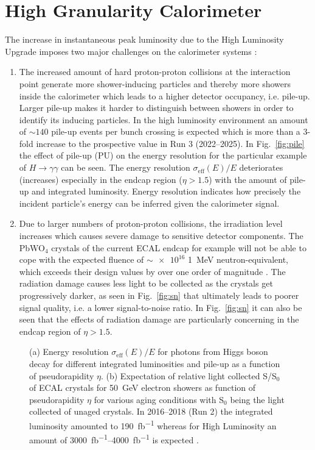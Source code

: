 \documentclass[../../main.tex]{subfiles}
\begin{document}
\section{High Granularity Calorimeter}\label{chp:hgcal}
The increase in instantaneous peak luminosity due to the High Luminosity Upgrade imposes two major challenges on the calorimeter systems \cite{db_hgcal}:
\begin{enumerate}
	\item The increased amount of hard proton-proton collisions at the interaction point generate more shower-inducing particles and thereby more showers inside the calorimeter which leads to a higher detector occupancy, i.e. pile-up. Larger pile-up makes it harder to distinguish between showers in order to identify its inducing particles. In the high luminosity environment an amount of $\sim140$ pile-up events per bunch crossing is expected which is more than a 3-fold increase to the prospective value in Run 3 \cite{hgcal} (2022--2025). In Fig.~\ref{fig:pile} the effect of pile-up (PU) on the energy resolution for the particular example of $H\rightarrow\gamma\gamma$ can be seen. The energy resolution $\sigma_\text{eff}(E)/E$ deteriorates (increases) especially in the endcap region ($\eta > 1.5$) with the amount of pile-up and integrated luminosity. Energy resolution indicates how precisely the incident particle's energy can be inferred given the calorimeter signal.
	\item Due to larger numbers of proton-proton collisions, the irradiation level increases which causes severe damage to sensitive detector components. The PbWO$_4$ crystals of the current ECAL endcap for example will not be able to cope with the expected fluence of $\sim\num{e16}$ \SI{1}{MeV} neutron-equivalent, which exceeds their design values by over one order of magnitude \cite{zhang,anfreville,pileup}. The radiation damage causes less light to be collected as the crystals get progressively darker, as seen in Fig.~\ref{fig:sn} that ultimately leads to poorer signal quality, i.e. a lower signal-to-noise ratio. In Fig.~\ref{fig:sn} it can also be seen that the effects of radiation damage are particularly concerning in the endcap region of $\eta > 1.5$.
\end{enumerate}
\begin{figure}[htp]
	\centering
	\hspace{5mm}
	\caption{(a) Energy resolution $\sigma_\text{eff}(E)/E$ for photons from Higgs boson decay for different integrated luminosities and pile-up as a function of pseudorapidity $\eta$. (b) Expectation of relative light collected S/S$_0$ of ECAL crystals for \SI{50}{GeV} electron showers as function of pseudorapidity $\eta$ for various aging conditions with S$_0$ being the light collected of unaged crystals. In 2016--2018 (Run 2) the integrated luminosity amounted to \SI{190}{fb^{-1}} whereas for High Luminosity an amount of \SIrange{3000}{4000}{fb^{-1}} is expected \cite{phase2}.}
\end{figure}
\end{document}
